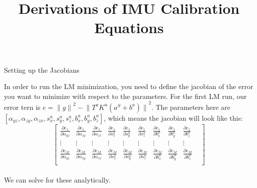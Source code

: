 \documentclass{article}
\title{Derivations of IMU Calibration Equations}
\author{}
\date{}
\begin{document}
\maketitle

\large{Setting up the Jacobians}

In order to run the LM minimization, you need to define the jacobian of the error you want to minimize with respect to the parameters.
For the first LM run, our error tern is $e={\lVert g\rVert}^2-{\lVert T^aK^a(a^S+b^a)\rVert}^2$. The parameters here are $[\alpha_{yz}, \alpha_{zy}, \alpha_{zx}, s^a_x, s^a_y, s^a_z, b^a_x, b^a_y, b^a_z]$, which means the jacobian will look like this: \\

$$\begin{bmatrix}
  \frac{\partial e_1}{\partial \alpha_{yz}} & \frac{\partial e_1}{\partial \alpha_{zy}} & \frac{\partial e_1}{\partial \alpha_{zx}} & \frac{\partial e_1}{\partial s^a_x} & \frac{\partial e_1}{\partial s^a_y} & \frac{\partial e_1}{\partial s^a_z} & \frac{\partial e_1}{\partial b^a_x} & \frac{\partial e_1}{\partial b^a_y} & \frac{\partial e_1}{\partial b^a_z} \\
  \vdots & \vdots & \vdots & \vdots & \vdots & \vdots & \vdots & \vdots & \vdots & \\
  \frac{\partial e_M}{\partial \alpha_{yz}} & \frac{\partial e_M}{\partial \alpha_{zy}} & \frac{\partial e_M}{\partial \alpha_{zx}} & \frac{\partial e_M}{\partial s^a_x} & \frac{\partial e_M}{\partial s^a_y} & \frac{\partial e_M}{\partial s^a_z} & \frac{\partial e_M}{\partial b^a_x} & \frac{\partial e_M}{\partial b^a_y} & \frac{\partial e_M}{\partial b^a_z} \\
\end{bmatrix}$$ \\

We can solve for these analytically.
\end{document}
